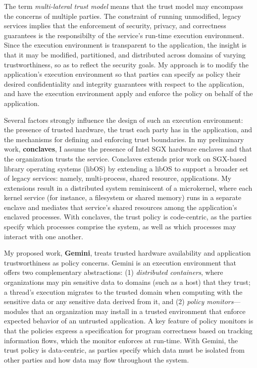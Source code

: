 

The term \emph{multi-lateral trust model} means that the trust model may
encompass the concerns of multiple parties.
%
The constraint of running unmodified, legacy services implies that the
enforcement of security, privacy, and correctness guarantees is the
responsibilty of the service's run-time execution environment. 
%
Since the execution environment is transparent to the application, the insight
is that it may be modified, partitioned, and distributed across domains of
varying trustworthiness, so as to reflect the security goals.
%
My approach is to modify the application's execution environment so that
parties can specify as policy their desired confidentiality and integrity
guarantees with respect to the application, and have the execution environment
apply and enforce the policy on behalf of the application.


Several factors strongly influence the design of such an execution environment:
the presence of trusted hardware, the trust each party has in the application,
and the mechanisms for defining and enforcing trust boundaries.
%
In my preliminary work, \textbf{conclaves}, I assume the presence of Intel SGX hardware
enclaves and that the organization trusts the service.
%
Conclaves extends prior work on SGX-based library operating systems (libOS) by
extending a libOS to support a broader set of legacy services: namely,
multi-process, shared resource, applications.
%
My extensions result in a distributed system reminiscent of a microkernel,
where each kernel service (for instance, a filesystem or shared memory)
runs in a separate enclave and mediates that service’s shared resources
among the application’s enclaved processes.
%
With conclaves, the trust policy is code-centric, as the parties specify which
processes comprise the system, as well as which processes may interact with one
another.


My proposed work, \textbf{Gemini}, treats trusted hardware availability and
application trustworthiness as policy concerns.
%
Gemini is an execution environment that offers two complementary abstractions:
(1) \emph{distributed containers}, where organizations may pin sensitive data to
domains (such as a host) that they trust; a thread's execution migrates to the
trusted domain when computing with the sensitive data or any sensitive data
derived from it, and (2) \emph{policy monitors}---modules that an organization
may install in a trusted environment that enforce expected behavior of an
untrusted application.
%
A key feature of policy monitors is that the policies express a specification
for program correctness based on tracking information flows, which
the monitor enforces at run-time.
%
With Gemini, the trust policy is data-centric, as parties specify which data
must be isolated from other parties and how data may flow throughout the
system.


